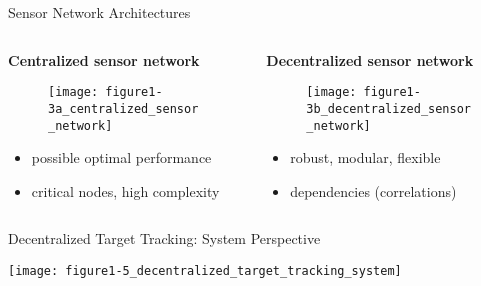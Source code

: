 \documentclass[aspectratio=1610]{beamer}
\begin{document}
\begin{frame}{Sensor Network Architectures}

\begin{columns}

\begin{column}{.5\textwidth}
    \begin{center}\textbf{Centralized sensor network}\end{center}
    \begin{figure}
        \centering
        \texttt{[image: figure1-3a\_centralized\_sensor\_network]}
    \end{figure}
    \begin{center}
        \begin{itemize}
            \item possible optimal performance
            \item critical nodes, high complexity
        \end{itemize}
    \end{center}
\end{column}

\begin{column}{.5\textwidth}
    \begin{center}\textbf{Decentralized sensor network}\end{center}
    \begin{figure}
        \centering
        \texttt{[image: figure1-3b\_decentralized\_sensor\_network]}
    \end{figure}
    \begin{center}
        \begin{itemize}
            \item robust, modular, flexible
            \item dependencies (correlations)
        \end{itemize}
    \end{center}
\end{column}

\end{columns}

\end{frame}



\begin{frame}{Decentralized Target Tracking: System Perspective}

\begin{center}
    \texttt{[image: figure1-5\_decentralized\_target\_tracking\_system]}
\end{center}

\end{frame}
\end{document}
